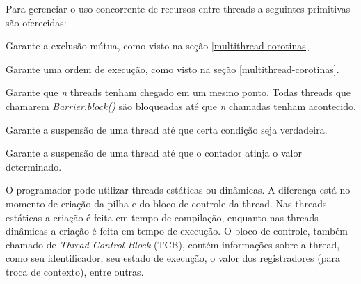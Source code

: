 Para gerenciar o uso concorrente de recursos entre threads a seguintes primitivas são oferecidas:
\begin{description}
    \setlength{\itemsep}{0.3pt}
    \setlength{\parskip}{0pt}
      \setlength{\parsep}{0pt}
    \item[Mutex] Garante a exclusão mútua, como visto na seção \ref{multithread-corotinas}.
    \item[Semáforo] Garante uma ordem de execução, como visto na seção \ref{multithread-corotinas}.
    \item[Barreira] Garante que \textit{n} threads tenham chegado em um mesmo ponto. Todas threads que chamarem
        \textit{Barrier.block()} são bloqueadas até que \textit{n} chamadas tenham acontecido.
    \item[Variável de condição] Garante a suspensão de uma thread até que certa condição seja verdadeira.
    \item[Contador bloqueante] Garante a suspensão de uma thread até que o contador atinja o valor determinado.
\end{description}

O programador pode utilizar threads estáticas ou dinâmicas. A diferença está no momento de criação da pilha e do bloco de controle da
thread. Nas threads estáticas a criação é feita em tempo de compilação, enquanto nas threads dinâmicas 
a criação é feita em tempo de execução. O bloco de controle, também chamado de
\textit{Thread Control Block} (TCB), contém informações sobre a thread, como seu identificador, seu estado de
execução, o valor dos registradores (para troca de contexto), entre outras\cite{TEP134}.

